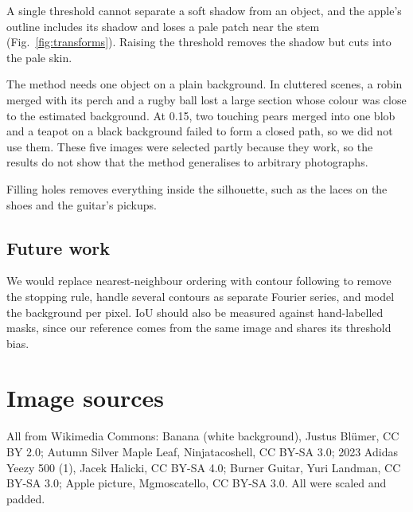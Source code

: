 \documentclass[conference]{IEEEtran}
\begin{document}
    A single threshold cannot separate a soft shadow from an object, and the apple's outline includes its shadow and loses a pale patch near the stem (Fig.~\ref{fig:transforms}).
    Raising the threshold removes the shadow but cuts into the pale skin.

    The method needs one object on a plain background.
    In cluttered scenes, a robin merged with its perch and a rugby ball lost a large section whose colour was close to the estimated background.
    At 0.15, two touching pears merged into one blob and a teapot on a black background failed to form a closed path, so we did not use them.
    These five images were selected partly because they work, so the results do not show that the method generalises to arbitrary photographs.

    Filling holes removes everything inside the silhouette, such as the laces on the shoes and the guitar's pickups.

    \subsection{Future work}\label{subsec:future-work}

    We would replace nearest-neighbour ordering with contour following to remove the stopping rule, handle several contours as separate Fourier series, and model the background per pixel.
    IoU should also be measured against hand-labelled masks, since our reference comes from the same image and shares its threshold bias.

    \section*{Image sources}
    All from Wikimedia Commons:
        Banana (white background), Justus Bl\"umer, CC BY 2.0;
        Autumn Silver Maple Leaf, Ninjatacoshell, CC BY-SA 3.0;
        2023 Adidas Yeezy 500 (1), Jacek Halicki, CC BY-SA 4.0;
        Burner Guitar, Yuri Landman, CC BY-SA 3.0;
        Apple picture, Mgmoscatello, CC BY-SA 3.0.
    All were scaled and padded.
    \printbibliography
\end{document}
